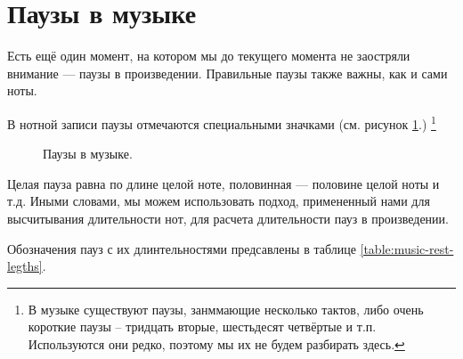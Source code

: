 \documentclass[a4paper,twoside]{book}
\begin{document}
\section{Паузы в музыке}

Есть ещё один момент, на котором мы до текущего момента не заостряли внимание ---
паузы в произведении. Правильные паузы также важны, как и сами ноты.

В нотной записи паузы отмечаются специальными значками (см. рисунок
\ref{fig:lilypond-rest-example-1}.) \footnote{В музыке существуют паузы,
занммающие несколько тактов, либо очень короткие паузы -- тридцать вторые,
шестьдесят четвёртые и т.п. Используются они редко, поэтому мы их не будем
разбирать здесь.}

\begin{figure}[ht]
  \caption{Паузы в музыке.}
  \centering
  \label{fig:lilypond-rest-example-1}
\end{figure}

Целая пауза равна по длине целой ноте, половинная --- половине целой ноты и т.д.
Иными словами, мы можем использовать подход, примененный нами для высчитывания
длительности нот, для расчета длительности пауз в произведении.

Обозначения пауз с их длинтельностями предсавлены в таблице
\ref{table:music-rest-legths}.
\end{document}
